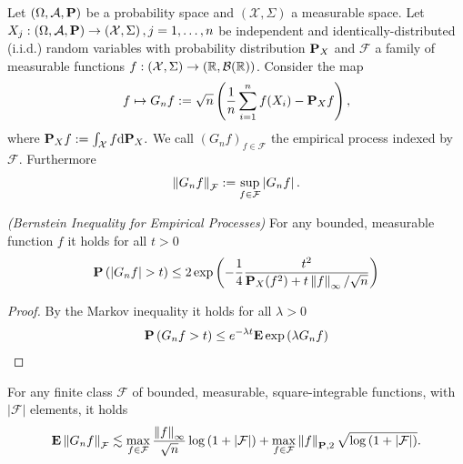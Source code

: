 
Let 
$
  \left( 
    \Omega,
    \mathcal{A},
    \P
  \right)
$
be a probability space
and
$
  \left( 
    \mathcal{X},
    \Sigma
  \right)
$
a measurable space.
Let 
$
  X_j
  :
  \left( 
    \Omega,
    \mathcal{A},
    \P
  \right)
  \to
  \left( 
    \mathcal{X},
    \Sigma
  \right)
  ,
  j=1,\ldots, n
$ be independent and identically-distributed (i.i.d.)
random variables
with probability distribution $\P_X$ 
and
$\mathcal{F}$ a family of measurable functions
$
  f:
  \left( 
    \mathcal{X},
    \Sigma
  \right)
    \to
  \left( 
    \R,
    \mathcal{B}(\R)
  \right)
$.
Consider the map
\begin{gather}
  f
  \mapsto
  G_n f
  :=
  \sqrt{n}
  \left( 
    \frac{1}{n}
    \sum_{i = 1}^{n}
      f(X_i)
    -
    \P_X f
  \right),
\end{gather}
where
$
  \P_X f 
  :=
  \int_\mathcal{X} f \text{d}\P_X.
$
We call 
$
  \left( 
    G_n f
  \right)_{f \in \mathcal{F}}
$
the empirical process indexed by $\mathcal{F}$.
Furthermore
\begin{gather}
  \norm{G_n f}_\mathcal{F}
  :=
  \sup_
        { f \in \mathcal{F}}
        \left|
          G_n f
        \right|
        .
\end{gather}

\begin{lemma}
  \emph{(Bernstein Inequality for Empirical Processes)}
  For any bounded, measurable function $f$
  it holds for all $t > 0$
  \begin{gather}
    \P 
    \left(
      \left| 
        G_n f
      \right|
      >
      t
    \right)
    \le
    2
    \exp
    \left( 
      - \frac{1}{4}
      \frac{t^2}
      {
        \P_X(f^2)
        +
        t
        \norm{f}_\infty
        /
        \sqrt{n}
      }
    \right)
  \end{gather}
\end{lemma}
\begin{proof}
  By the Markov inequality it holds for all $\lambda > 0$
  \begin{gather}
    \P
    \left( 
      G_n f 
      > 
      t
    \right)
    \le
    e^{-\lambda t}
    \E
    \exp
    \left( 
      \lambda
      G_n f 
    \right)
  \end{gather}
\end{proof}


\begin{lemma}
  For any finite class $\mathcal{F}$ of bounded, measurable, square-integrable functions, with $\left| \mathcal{F} \right|$ elements, it holds
  \begin{gather}
    \E \norm{G_n f}_\mathcal{F}
    \lesssim
    \max_
          {f \in \mathcal{F}}
          \frac{\norm{f}_\infty}{\sqrt{n}}
          \log
          \left( 1 + \left| \mathcal{F} \right| \right)
          +
          \max_
              {f \in \mathcal{F}}
              \norm{f}_{\P,2}
              \sqrt{
                \log \left( 
                  1 + \left| \mathcal{F} \right|
                \right)
              }
              .
  \end{gather}
\end{lemma}

